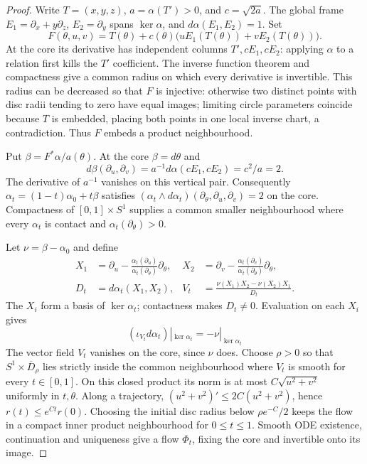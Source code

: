 \begin{proof}\leanok
Write $T=(x,y,z)$, $a=\alpha(T')>0$, and $c=\sqrt{2a}$.
The global frame $E_1=\partial_x+y\partial_z$, $E_2=\partial_y$ spans
$\ker\alpha$, and $d\alpha(E_1,E_2)=1$. Set
\begin{equation}
 F(\theta,u,v)=T(\theta)+c(\theta)
       \bigl(uE_1(T(\theta))+vE_2(T(\theta))\bigr).
\end{equation}
At the core its derivative has independent columns $T',cE_1,cE_2$:
applying $\alpha$ to a relation first kills the $T'$ coefficient.
The inverse function theorem and compactness give a common radius on
which every derivative is invertible. This radius can be decreased so
that $F$ is injective: otherwise two distinct points with disc radii
tending to zero have equal images; limiting circle parameters coincide
because $T$ is embedded, placing both points in one local inverse chart,
a contradiction. Thus $F$ embeds a product neighbourhood.

Put $\beta=F^*\alpha/a(\theta)$. At the core $\beta=d\theta$ and
\begin{equation}
 d\beta(\partial_u,\partial_v)
 =a^{-1}d\alpha(cE_1,cE_2)=c^2/a=2.
\end{equation}
The derivative of $a^{-1}$ vanishes on this vertical pair. Consequently
$\alpha_t=(1-t)\alpha_0+t\beta$ satisfies
$(\alpha_t\wedge d\alpha_t)(\partial_\theta,\partial_u,\partial_v)=2$
on the core. Compactness of $[0,1]\times S^1$ supplies a common smaller
neighbourhood where every $\alpha_t$ is contact and
$\alpha_t(\partial_\theta)>0$.

Let $\nu=\beta-\alpha_0$ and define
\begin{align}
 X_1&=\partial_u-
   \frac{\alpha_t(\partial_u)}{\alpha_t(\partial_\theta)}\partial_\theta,
 &X_2&=\partial_v-
   \frac{\alpha_t(\partial_v)}{\alpha_t(\partial_\theta)}\partial_\theta,
 \\
 D_t&=d\alpha_t(X_1,X_2),
 &V_t&=\frac{\nu(X_1)X_2-\nu(X_2)X_1}{D_t}.
\end{align}
The $X_i$ form a basis of $\ker\alpha_t$; contactness makes $D_t\ne0$.
Evaluation on each $X_i$ gives
\begin{equation}
(\iota_{V_t}d\alpha_t)|_{\ker\alpha_t}=-\nu|_{\ker\alpha_t}
\end{equation}
The vector field $V_t$ vanishes on the core, since $\nu$ does.
Choose $\rho>0$ so that $S^1\times\overline D_\rho$ lies strictly
inside the common neighbourhood where $V_t$ is smooth for every
$t\in[0,1]$. On this closed product its norm is at most
$C\sqrt{u^2+v^2}$ uniformly in $t,\theta$. Along a trajectory,
$(u^2+v^2)'\leq2C(u^2+v^2)$, hence
$r(t)\leq e^{Ct}r(0)$. Choosing the initial disc radius below
$\rho e^{-C}/2$ keeps the flow in a compact inner product neighbourhood
for $0\leq t\leq1$. Smooth ODE existence, continuation and uniqueness
give a flow $\Phi_t$, fixing the core and invertible onto its image.


\end{proof}
